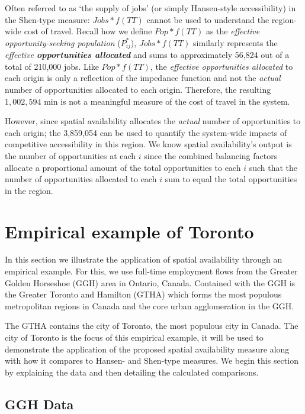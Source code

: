 \documentclass[]{elsarticle} %
\begin{document}
Often referred to as `the supply of jobs' (or simply Hansen-style
accessibility) in the Shen-type measure: \(Jobs*f(TT)\) cannot be used
to understand the region-wide cost of travel. Recall how we define
\(Pop*f(TT)\) as the \emph{effective opportunity-seeking population}
(\(P^*_{ij}\)), \(Jobs*f(TT)\) similarly represents the \emph{effective
\textbf{opportunities allocated}} and sums to approximately 56,824 out
of a total of 210,000 jobs. Like \(Pop*f(TT)\), the \emph{effective
opportunities allocated} to each origin is only a reflection of the
impedance function and not the \emph{actual} number of opportunities
allocated to each origin. Therefore, the resulting
\(1,002,594\text{ min}\) is not a meaningful measure of the cost of
travel in the system.

However, since spatial availability allocates the \emph{actual} number
of opportunities to each origin; the 3,859,054 can be used to
quantify the system-wide impacts of competitive accessibility in this
region. We know spatial availability's output is the number of
opportunities at each \(i\) since the combined balancing factors
allocate a proportional amount of the total opportunities to each \(i\)
such that the number of opportunities allocated to each \(i\) sum to
equal the total opportunities in the region.

\hypertarget{empirical-example-of-toronto}{%
\section{Empirical example of
Toronto}\label{empirical-example-of-toronto}}

In this section we illustrate the application of spatial availability
through an empirical example. For this, we use full-time employment
flows from the Greater Golden Horseshoe (GGH) area in Ontario, Canada.
Contained with the GGH is the Greater Toronto and Hamilton (GTHA) which
forms the most populous metropolitan regions in Canada and the core
urban agglomeration in the GGH.

The GTHA contains the city of Toronto, the most populous city in Canada.
The city of Toronto is the focus of this empirical example, it will be
used to demonstrate the application of the proposed spatial availability
measure along with how it compares to Hansen- and Shen-type measures. We
begin this section by explaining the data and then detailing the
calculated comparisons.

\hypertarget{ggh-data}{%
\subsection{GGH Data}\label{ggh-data}}
\end{document}
